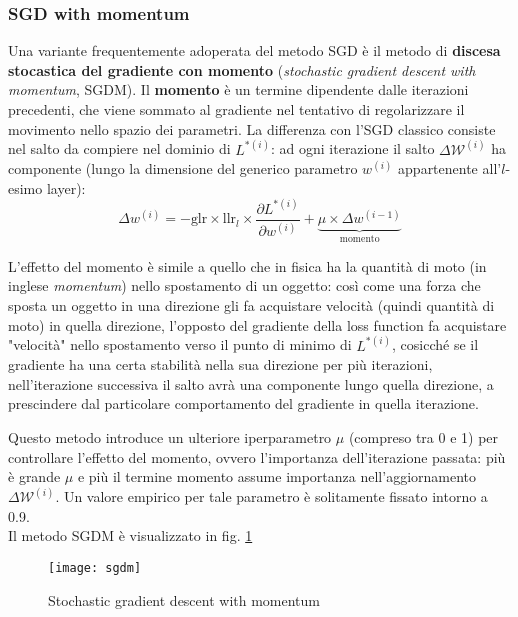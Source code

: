 \subsubsection{SGD with momentum}
Una variante frequentemente adoperata del metodo SGD è il metodo di \textbf{discesa stocastica del gradiente con momento} (\textit{stochastic gradient descent with momentum}, SGDM).
Il \textbf{momento} è un termine dipendente dalle iterazioni precedenti, che viene sommato al gradiente nel tentativo di regolarizzare il movimento nello spazio dei parametri.
La differenza con l'SGD classico consiste nel salto da compiere nel dominio di $L^{*(i)}$: ad ogni iterazione il salto $\Delta \mathcal{W}^{(i)}$ ha componente (lungo la dimensione del generico parametro $w^{(i)}$ appartenente all'$l$-esimo layer):
\[
\Delta w^{(i)}=-\text{glr}\times \text{llr}_l\times \frac{\partial L^{*(i)}}{\partial w^{(i)}}+\underbrace{\mu\times\Delta w^{(i-1)}}_{\text{momento}}
\]

L'effetto del momento è simile a quello che in fisica ha la quantità di moto (in inglese \textit{momentum}) nello spostamento di un oggetto: così come una forza che sposta un oggetto in una direzione gli fa acquistare velocità (quindi quantità di moto) in quella direzione, l'opposto del gradiente della loss function fa acquistare "velocità" nello spostamento verso il punto di minimo di $L^{*(i)}$, cosicché se il gradiente ha una certa stabilità nella sua direzione per più iterazioni, nell'iterazione successiva il salto avrà una componente lungo quella direzione, a prescindere dal particolare comportamento del gradiente in quella iterazione.

Questo metodo introduce un ulteriore iperparametro $\mu$ (compreso tra 0 e 1) per controllare l'effetto del momento, ovvero l'importanza dell'iterazione passata: più è grande $\mu$ e più il termine momento assume importanza nell'aggiornamento $\Delta \mathcal{W}^{(i)}$. Un valore empirico per tale parametro è solitamente fissato intorno a 0.9.\\

Il metodo SGDM è visualizzato in fig. \ref{fig:sgdm}

\begin{figure}[h!]
\centering
\texttt{[image: sgdm]}
\caption{Stochastic gradient descent with momentum}
\label{fig:sgdm}
\end{figure}

